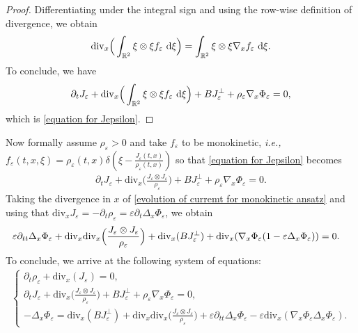 \documentclass[11pt,reqno]{amsart}
\numberwithin{equation}{section}
\def\dd{{\rm d}}
\begin{document}
\begin{proof}
Differentiating under the integral sign and using the row-wise definition of divergence, we obtain
\begin{align}
\mathrm{div}_{x}\Big(\int_{\mathbb{R}^{2}}\xi\otimes \xi f_{\varepsilon} \ \dd \xi\Big)
=\int_{\mathbb{R}^{2}}\xi\otimes \xi\nabla_{x}f_{\varepsilon}\ \dd \xi. \label{identity for div}    
\end{align}
To conclude, we have 
\begin{align}
\partial_{t}J_{\varepsilon}+\mathrm{div}_{x}
\Big(\int_{\mathbb{R}^{2}}\xi\otimes \xi f_{\varepsilon} \ \dd \xi\Big)+BJ_{\varepsilon}^{\perp}+\rho_{\varepsilon}\nabla_{x} \Phi_{\varepsilon}=0,    
\end{align}
which is \eqref{equation for Jepsilon}. 
\end{proof}
Now formally assume $\rho_\varepsilon>0$ and take $f_{\varepsilon}$ to be monokinetic, {\it i.e.,} $f_{\varepsilon}(t,x,\xi)=\rho_{\varepsilon}(t,x)\delta(\xi-\frac{J_{\varepsilon}(t,x)}{\rho_{\varepsilon}(t,x)})$ so that \eqref{equation for Jepsilon} becomes 
\begin{align}
\partial_{t}J_{\varepsilon}+\mathrm{div}_{x}\Big(\frac{J_{\varepsilon}\otimes J_{\varepsilon}}{\rho_{\varepsilon}}\Big)
+BJ_{\varepsilon}^{\perp}+\rho_{\varepsilon}\nabla_{x}\Phi_{\varepsilon}=0.   \label{evolution of curremt for monokinetic ansatz}  
\end{align}
Taking the divergence in $x$ of \eqref{evolution of curremt for monokinetic ansatz} and using that $\mathrm{div}_{x}J_{\varepsilon}=-\partial_{t}\rho_{\varepsilon}=\varepsilon \partial_{t}\Delta_{x}\Phi_{\varepsilon}$, we obtain  
\begin{align}
&\varepsilon \partial_{tt}\Delta_{x} \Phi_{\varepsilon}+\mathrm{div}_{x}\mathrm{div}_{x}\Big(\frac{J_{\varepsilon}\otimes J_{\varepsilon}}{\rho_{\varepsilon}}\Big)\notag+\mathrm{div}_{x}(BJ_{\varepsilon}^{\perp})+\mathrm{div}_{x}(\nabla_{x} \Phi_{\varepsilon}(1-\varepsilon\Delta_{x} \Phi_{\varepsilon}))=0. 
\label{equation for deltaphieps}       
\end{align} 
To conclude, we arrive at the following system of equations:  
\begin{align*}
\begin{cases}
\partial_{t}\rho_{\varepsilon}+\mathrm{div}_{x}(J_{\varepsilon})=0,\\
\partial_{t}J_{\varepsilon}+\mathrm{div}_{x}\big(\frac{J_{\varepsilon}\otimes J_{\varepsilon}}{\rho_{\varepsilon}}\big)+BJ_{\varepsilon}^{\perp}+\rho_{\varepsilon}\nabla_{x}\Phi_{\varepsilon}=0,\\
-\Delta_{x} \Phi_{\varepsilon}=\mathrm{div}_{x}(BJ_{\varepsilon}^{\perp})
+\mathrm{div}_{x}\mathrm{div}_{x}\big(\frac{J_{\varepsilon}\otimes J_{\varepsilon}}{\rho_{\varepsilon}}\big)+\varepsilon\partial_{tt}\Delta_{x} \Phi_{\varepsilon}-\varepsilon\mathrm{div}_{x}(\nabla_{x}\Phi_{\varepsilon}\Delta_{x}\Phi_{\varepsilon}). 
\end{cases}    
\end{align*}
\end{document}
